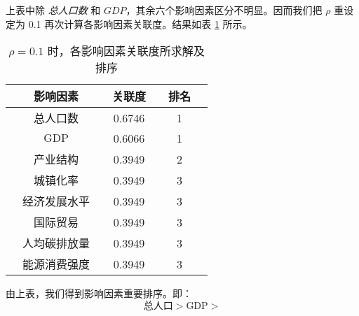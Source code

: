       上表中除 \emph{总人口数} 和 $GDP$，其余六个影响因素区分不明显。因而我们把 $\rho$ 重设定为 0.1 再次计算各影响因素关联度。结果如表 \ref{tab:guanlianxu0.1} 所示。
      \begin{table}[htb]
        \centering
        \caption{$\rho=0.1$ 时，各影响因素关联度所求解及排序}
        \begin{tabular*}{0.618\paperwidth}{@{\extracolsep{\fill}}ccccccc}
          \toprule[1.5pt]
          &影响因素 && 关联度 && 排名 &\\
          \midrule[1pt]
          &总人口数 && 0.6746 && 1 &\\
          &$\mathrm{GDP}$ && 0.6066 && 1 &\\
          &产业结构 && 0.3949 && 2 &\\
          &城镇化率 && 0.3949 && 3 &\\
          &经济发展水平 && 0.3949 && 3 &\\
          &国际贸易 && 0.3949 && 3 &\\
          &人均碳排放量 && 0.3949 && 3 &\\
          &能源消费强度 && 0.3949 && 3 &\\
          \bottomrule[1.5pt]
        \end{tabular*}
        \label{tab:guanlianxu0.1}
      \end{table}

      由上表，我们得到影响因素重要排序。即：
      \[
        \text{总人口}>\textrm{GDP}>
      \]